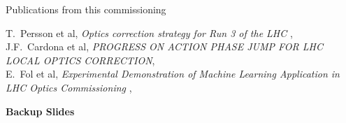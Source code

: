 \documentclass[4pt,usenames,dvipsnames,aspectratio=169,table]{beamer}
\begin{document}
\begin{frame}{Publications from this commissioning}


        
        T.~Persson et al,
        \emph{
Optics correction strategy for Run 3 of the LHC	},
        \\[0.5em]
        
        
        J.F.~Cardona et al,
        \emph{PROGRESS ON ACTION PHASE JUMP FOR LHC LOCAL OPTICS
CORRECTION},
        \\[0.5em]
        

        E.~Fol et al,
        \emph{
Experimental Demonstration of Machine Learning Application in LHC Optics Commissioning
	},
        \\[0.5em]
    
\end{frame}



\begin{frame}{}

\begin{center}
{\Huge \textbf{Backup Slides}}
\end{center}
    
\end{frame}


\end{document}
